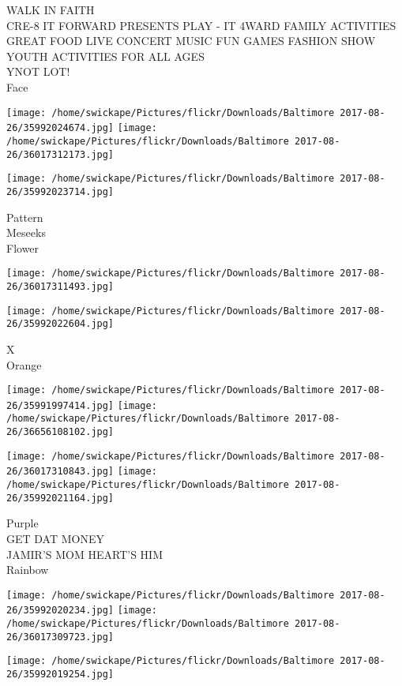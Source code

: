 \documentclass[10pt,letterpaper]{article}
\begin{document}
WALK IN FAITH\\
CRE{-}8 IT FORWARD PRESENTS PLAY {-} IT 4WARD FAMILY ACTIVITIES GREAT FOOD LIVE CONCERT MUSIC FUN GAMES FASHION SHOW YOUTH ACTIVITIES FOR ALL AGES\\
YNOT LOT!\\
Face
\pagebreak

\texttt{[image: /home/swickape/Pictures/flickr/Downloads/Baltimore 2017-08-26/35992024674.jpg]}
\texttt{[image: /home/swickape/Pictures/flickr/Downloads/Baltimore 2017-08-26/36017312173.jpg]}

\vspace{0.25in}
\texttt{[image: /home/swickape/Pictures/flickr/Downloads/Baltimore 2017-08-26/35992023714.jpg]}

Pattern\\
Meseeks\\
Flower
\pagebreak

\texttt{[image: /home/swickape/Pictures/flickr/Downloads/Baltimore 2017-08-26/36017311493.jpg]}

\vspace{0.25in}
\texttt{[image: /home/swickape/Pictures/flickr/Downloads/Baltimore 2017-08-26/35992022604.jpg]}

X\\
Orange
\pagebreak

\texttt{[image: /home/swickape/Pictures/flickr/Downloads/Baltimore 2017-08-26/35991997414.jpg]}
\texttt{[image: /home/swickape/Pictures/flickr/Downloads/Baltimore 2017-08-26/36656108102.jpg]}

\texttt{[image: /home/swickape/Pictures/flickr/Downloads/Baltimore 2017-08-26/36017310843.jpg]}
\texttt{[image: /home/swickape/Pictures/flickr/Downloads/Baltimore 2017-08-26/35992021164.jpg]}

Purple\\
GET DAT MONEY\\
JAMIR'S MOM HEART'S HIM\\
Rainbow
\pagebreak

\texttt{[image: /home/swickape/Pictures/flickr/Downloads/Baltimore 2017-08-26/35992020234.jpg]}
\texttt{[image: /home/swickape/Pictures/flickr/Downloads/Baltimore 2017-08-26/36017309723.jpg]}

\vspace{0.25in}
\texttt{[image: /home/swickape/Pictures/flickr/Downloads/Baltimore 2017-08-26/35992019254.jpg]}
\end{document}
